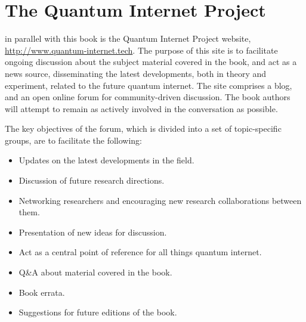 %
%

\section{The Quantum Internet Project}

 in parallel with this book is the Quantum Internet Project website, \url{http://www.quantum-internet.tech}. The purpose of this site is to facilitate ongoing discussion about the subject material covered in the book, and act as a news source, disseminating the latest developments, both in theory and experiment, related to the future quantum internet. The site comprises a blog, and an open online forum for community-driven discussion. The book authors will attempt to remain as actively involved in the conversation as possible.

The key objectives of the forum, which is divided into a set of topic-specific groups, are to facilitate the following:
\begin{itemize}
\item Updates on the latest developments in the field.
\item Discussion of future research directions.
\item Networking researchers and encouraging new research collaborations between them.
\item Presentation of new ideas for discussion.
\item Act as a central point of reference for all things quantum internet.
\item Q\&A about material covered in the book.
\item Book errata.
\item Suggestions for future editions of the book.
\end{itemize}

